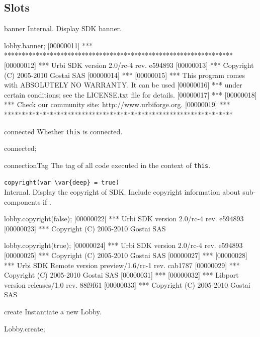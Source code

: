 \subsection{Slots}
\begin{urbiscriptapi}
\item[banner] Internal.  Display \urbi SDK banner.
\begin{urbiscript}
lobby.banner;
[00000011] *** *****************************************************************
[00000012] *** Urbi SDK version 2.0/rc-4 rev. e594893
[00000013] *** Copyright (C) 2005-2010 Gostai SAS
[00000014] ***
[00000015] *** This program comes with ABSOLUTELY NO WARRANTY.  It can be used
[00000016] *** under certain conditions; see the LICENSE.txt file for details.
[00000017] ***
[00000018] *** Check our community site: http://www.urbiforge.org.
[00000019] *** *****************************************************************
\end{urbiscript}

\item[connected]
  Whether \lstinline|this| is connected.
\begin{urbiassert}
connected;
\end{urbiassert}

\item[connectionTag]
  The tag of all code executed in the context of \lstinline|this|.

\item \lstinline|copyright(var \var{deep} = true)|~\\
  Internal.  Display the copyright of \urbi SDK.  Include copyright
  information about sub-components if .
\begin{urbiscript}
lobby.copyright(false);
[00000022] *** Urbi SDK version 2.0/rc-4 rev. e594893
[00000023] *** Copyright (C) 2005-2010 Gostai SAS

lobby.copyright(true);
[00000024] *** Urbi SDK version 2.0/rc-4 rev. e594893
[00000025] *** Copyright (C) 2005-2010 Gostai SAS
[00000027] ***
[00000028] *** Urbi SDK Remote version preview/1.6/rc-1 rev. cab1787
[00000029] *** Copyright (C) 2005-2010 Gostai SAS
[00000031] ***
[00000032] *** Libport version releases/1.0 rev. 88f9f61
[00000033] *** Copyright (C) 2005-2010 Gostai SAS
\end{urbiscript}

\item[create]
  Instantiate a new Lobby.
\begin{urbiassert}
Lobby.create;
\end{urbiassert}


\end{urbiscriptapi}
